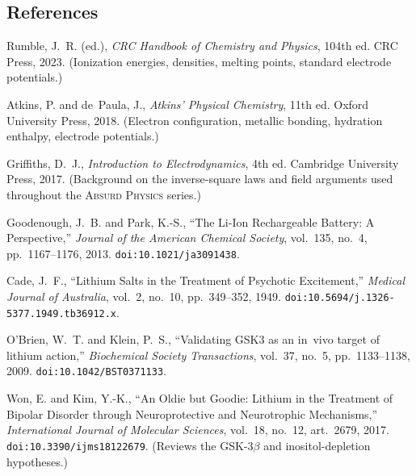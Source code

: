 \documentclass[11pt, letterpaper]{article}
\newcommand{\seriesname}{\textsc{Absurd Physics}}
\begin{document}
\subsection*{References}

\begin{enumerate}[label={[\arabic*]}, leftmargin=*, itemsep=2pt]
  \item Rumble, J.~R. (ed.), \textit{CRC Handbook of Chemistry and Physics}, 104th ed. CRC Press, 2023. (Ionization energies, densities, melting points, standard electrode potentials.)
  \item Atkins, P. and de~Paula, J., \textit{Atkins' Physical Chemistry}, 11th ed. Oxford University Press, 2018. (Electron configuration, metallic bonding, hydration enthalpy, electrode potentials.)
  \item Griffiths, D.~J., \textit{Introduction to Electrodynamics}, 4th ed. Cambridge University Press, 2017. (Background on the inverse-square laws and field arguments used throughout the \seriesname{} series.)
  \item Goodenough, J.~B. and Park, K.-S., ``The Li-Ion Rechargeable Battery: A Perspective,'' \textit{Journal of the American Chemical Society}, vol.~135, no.~4, pp.~1167--1176, 2013. \texttt{doi:10.1021/ja3091438}.
  \item Cade, J.~F., ``Lithium Salts in the Treatment of Psychotic Excitement,'' \textit{Medical Journal of Australia}, vol.~2, no.~10, pp.~349--352, 1949. \texttt{doi:10.5694/j.1326-5377.1949.tb36912.x}.
  \item O'Brien, W.~T. and Klein, P.~S., ``Validating GSK3 as an in~vivo target of lithium action,'' \textit{Biochemical Society Transactions}, vol.~37, no.~5, pp.~1133--1138, 2009. \texttt{doi:10.1042/BST0371133}.
  \item Won, E. and Kim, Y.-K., ``An Oldie but Goodie: Lithium in the Treatment of Bipolar Disorder through Neuroprotective and Neurotrophic Mechanisms,'' \textit{International Journal of Molecular Sciences}, vol.~18, no.~12, art.~2679, 2017. \texttt{doi:10.3390/ijms18122679}. (Reviews the GSK-3$\beta$ and inositol-depletion hypotheses.)
\end{enumerate}
\end{document}
